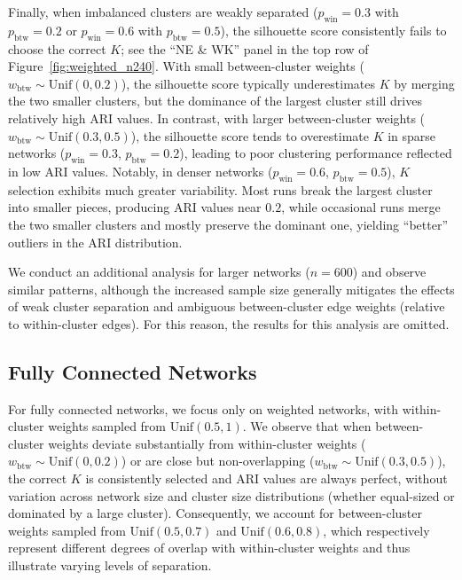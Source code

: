 \documentclass[12pt, titlepage, reqno]{article}
\begin{document}
Finally, when imbalanced clusters are weakly separated ($p_\text{win} 
= 0.3$ with $p_\text{btw} = 0.2$ or $p_\text{win} = 0.6$ with 
$p_\text{btw} = 0.5$), the silhouette score consistently fails to 
choose the correct $K$; see the ``NE \& WK'' panel in the top row of 
Figure~\ref{fig:weighted_n240}. With small between-cluster weights 
($w_\text{btw} \sim \text{Unif}(0,0.2)$), the silhouette score 
typically underestimates $K$ by merging the two smaller clusters, but 
the dominance of the largest cluster still drives relatively high ARI 
values. In contrast, with larger between-cluster weights 
($w_\text{btw} \sim \text{Unif}(0.3,0.5)$), the silhouette score 
tends to overestimate $K$ in sparse networks ($p_\text{win} = 0.3$, 
$p_\text{btw} = 0.2$), leading to poor clustering performance 
reflected in low ARI values. Notably, in denser networks 
($p_\text{win} = 0.6$, $p_\text{btw} = 0.5$), $K$ selection exhibits 
much greater variability. Most runs break the largest cluster into 
smaller pieces, producing ARI values near $0.2$, while occasional 
runs merge the two smaller clusters and mostly preserve the 
dominant one, yielding ``better'' outliers in the ARI 
distribution.


We conduct an additional analysis for larger networks ($n = 600$) and 
observe similar patterns, although the increased sample size 
generally mitigates the effects of weak cluster separation and 
ambiguous between-cluster edge weights (relative to within-cluster 
edges). For this reason, the results for this analysis are omitted.


\subsection{Fully Connected Networks}
\label{sec:fullyconn_res}


For fully connected networks, we focus only on weighted networks, 
with within-cluster weights sampled from $\text{Unif}(0.5,1)$. We 
observe that when between-cluster weights deviate substantially from 
within-cluster weights ($w_\text{btw} \sim \text{Unif}(0,0.2)$) or 
are close but non-overlapping ($w_\text{btw} \sim 
\text{Unif}(0.3, 0.5)$), the correct $K$ is consistently 
selected and ARI values are always perfect, without variation across 
network size and cluster size distributions (whether equal-sized or 
dominated by a large cluster). Consequently, we account for 
between-cluster weights sampled from $\text{Unif}(0.5, 0.7)$ and 
$\text{Unif}(0.6, 0.8)$, which respectively represent different 
degrees of overlap with within-cluster weights and thus illustrate 
varying levels of separation. 
\end{document}
